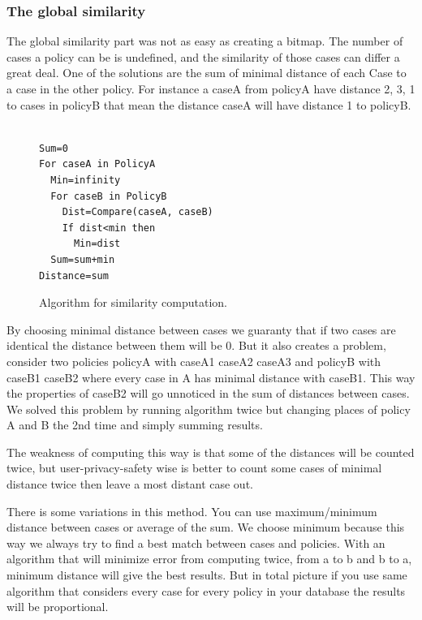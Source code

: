 \subsubsection{ The global similarity }
The global similarity part was not as easy as creating a bitmap. The number of cases a policy can be is undefined, and the similarity of those cases can differ a great deal. One of the solutions are the sum of minimal distance of each Case to a case in the other policy. For instance a caseA from policyA have distance 2, 3, 1 to cases in policyB that mean the distance caseA will have distance 1 to policyB. 

\begin{figure}[htpb]

\begin{verbatim}

Sum=0
For caseA in PolicyA
  Min=infinity
  For caseB in PolicyB
    Dist=Compare(caseA, caseB)
    If dist<min then
      Min=dist
  Sum=sum+min
Distance=sum
\end{verbatim}

  \caption{Algorithm for similarity computation.}
  \label{similAlgo}
\end{figure}
 

By choosing minimal distance between cases we guaranty that if two cases are identical the distance between them will be 0. But it also creates a problem, consider two policies policyA with {caseA1 caseA2 caseA3} and policyB with {caseB1 caseB2} where every case in A has minimal distance with caseB1. This way the properties of caseB2 will go unnoticed in the sum of distances between cases. We solved this problem by running algorithm twice but changing places of policy A and B the 2nd time and simply summing results.

The weakness of computing this way is that some of the distances will be counted twice, but user-privacy-safety wise is better to count some cases of minimal distance twice then leave a most distant case out.

There is some variations in this method. You can use maximum/minimum distance between cases or average of the sum. We choose minimum because this way we always try to find a best match between cases and policies. With an algorithm that will minimize error from computing twice, from a to b and b to a, minimum distance will give the best results. But in total picture if you use same algorithm that considers every case for every policy in your database the results will be proportional.

